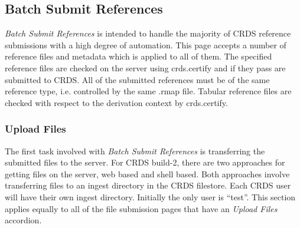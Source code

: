 \documentclass[letterpaper,10pt,english]{sphinxmanual}
\begin{document}
\subsection{Batch Submit References}
\label{web_site_use:batch-submit-references}
\emph{Batch Submit References} is intended to handle the majority of CRDS reference
submissions with a high degree of automation.   This page accepts a number of
reference files and metadata which is applied to all of them.   The specified
reference files are checked on the server using crds.certify and if they pass
are submitted to CRDS.   All of the submitted references must be of the same
reference type,  i.e. controlled by the same .rmap file.   Tabular reference
files are checked with respect to the derivation context by crds.certify.
\begin{figure}[htbp]
\centering

\end{figure}


\subsubsection{Upload Files}
\label{web_site_use:upload-files}
The first task involved with \emph{Batch Submit References} is transferring the
submitted files to the server.  For CRDS build-2,  there are two approaches for
getting files on the server,  web based and shell based.   Both approaches
involve transferring files to an ingest directory in the CRDS filestore.  Each
CRDS user will have their own ingest directory.   Initially the only user is
``test''.   This section applies equally to all of the file submission pages that
have an \emph{Upload Files} accordion.
\end{document}
